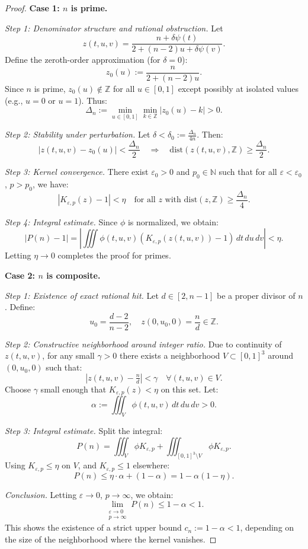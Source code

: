 \documentclass[12pt]{article}
\theoremstyle{definition}
\theoremstyle{plain}
\theoremstyle{remark}
\begin{document}
\begin{proof}

\textbf{Case 1: \( n \) is prime.}

\textit{Step 1: Denominator structure and rational obstruction.}  
Let
\[
z(t,u,v) = \frac{n + \delta \psi(t)}{2 + (n - 2) u + \delta \psi(v)}.
\]
Define the zeroth-order approximation (for \( \delta = 0 \)):
\[
z_0(u) := \frac{n}{2 + (n - 2)u}.
\]
Since \( n \) is prime, \( z_0(u) \notin \mathbb{Z} \) for all \( u \in [0,1] \) except possibly at isolated values (e.g., \( u = 0 \) or \( u = 1 \)). Thus:
\[
\Delta_n := \min_{u \in [0,1]} \min_{k \in \mathbb{Z}} |z_0(u) - k| > 0.
\]

\textit{Step 2: Stability under perturbation.}  
Let \( \delta < \delta_0 := \frac{\Delta_n}{4n} \). Then:
\[
\left| z(t,u,v) - z_0(u) \right| < \frac{\Delta_n}{2} \quad \Rightarrow \quad \mathrm{dist}(z(t,u,v), \mathbb{Z}) \geq \frac{\Delta_n}{2}.
\]

\textit{Step 3: Kernel convergence.}  
There exist \( \varepsilon_0 > 0 \) and \( p_0 \in \mathbb{N} \) such that for all \( \varepsilon < \varepsilon_0 \), \( p > p_0 \), we have:
\[
|K_{\varepsilon,p}(z) - 1| < \eta \quad \text{for all } z \text{ with } \mathrm{dist}(z, \mathbb{Z}) \geq \frac{\Delta_n}{4}.
\]

\textit{Step 4: Integral estimate.}  
Since \( \phi \) is normalized, we obtain:
\[
|P(n) - 1| = \left| \iiint \phi(t,u,v)(K_{\varepsilon,p}(z(t,u,v)) - 1)\, dt\, du\, dv \right| < \eta.
\]
Letting \( \eta \to 0 \) completes the proof for primes.

\medskip

\textbf{Case 2: \( n \) is composite.}

\textit{Step 1: Existence of exact rational hit.}  
Let \( d \in [2,n-1] \) be a proper divisor of \( n \). Define:
\[
u_0 = \frac{d - 2}{n - 2}, \quad z(0,u_0,0) = \frac{n}{d} \in \mathbb{Z}.
\]

\textit{Step 2: Constructive neighborhood around integer ratio.}  
Due to continuity of \( z(t,u,v) \), for any small \( \gamma > 0 \) there exists a neighborhood \( V \subset [0,1]^3 \) around \( (0, u_0, 0) \) such that:
\[
|z(t,u,v) - \tfrac{n}{d}| < \gamma \quad \forall (t,u,v) \in V.
\]
Choose \( \gamma \) small enough that \( K_{\varepsilon,p}(z) < \eta \) on this set. Let:
\[
\alpha := \iiint_V \phi(t,u,v) \, dt\,du\,dv > 0.
\]

\textit{Step 3: Integral estimate.}  
Split the integral:
\[
P(n) = \iiint_V \phi K_{\varepsilon,p} + \iiint_{[0,1]^3 \setminus V} \phi K_{\varepsilon,p}.
\]
Using \( K_{\varepsilon,p} \leq \eta \) on \( V \), and \( K_{\varepsilon,p} \leq 1 \) elsewhere:
\[
P(n) \leq \eta \cdot \alpha + (1 - \alpha) = 1 - \alpha(1 - \eta).
\]

\textit{Conclusion.}  
Letting \( \varepsilon \to 0 \), \( p \to \infty \), we obtain:
\[
\lim_{\substack{\varepsilon \to 0 \\ p \to \infty}} P(n) \leq 1 - \alpha < 1.
\]
This shows the existence of a strict upper bound \( c_n := 1 - \alpha < 1 \), depending on the size of the neighborhood where the kernel vanishes. 
\end{proof}
\end{document}
